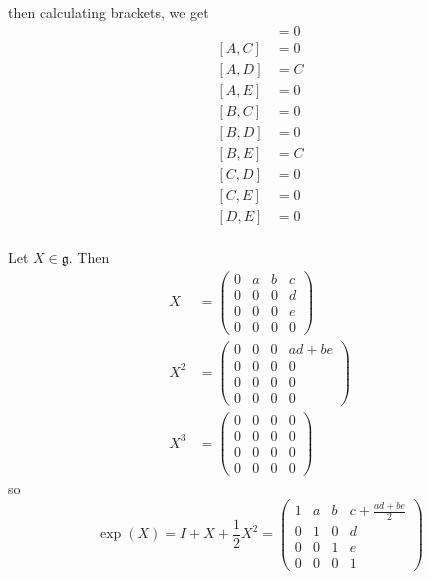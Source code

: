 \documentclass[12pt]{article}
\newcommand{\g}{\mathfrak{g}}
\begin{document}
        then calculating brackets, we get 
        \begin{align*}
            [A, B] &= 0\\
            [A, C] &= 0\\ 
            [A, D] &= C\\ 
            [A, E] &= 0\\
            [B, C] &= 0\\ 
            [B, D] &= 0\\
            [B, E] &= C\\
            [C, D] &= 0\\
            [C, E] &= 0\\
            [D, E] &= 0\\
        \end{align*}

        Let $X \in \g$. Then
        \begin{align*}
            X &= \begin{pmatrix}
                0 & a & b & c\\
                0 & 0 & 0 & d\\
                0 & 0 & 0 & e\\
                0 & 0 & 0 & 0
            \end{pmatrix}\\ 
            X^2 &= \begin{pmatrix}
                0 & 0 & 0 & ad + be\\
                0 & 0 & 0 & 0\\
                0 & 0 & 0 & 0\\
                0 & 0 & 0 & 0
            \end{pmatrix}\\ 
            X^3 &= \begin{pmatrix}
                0 & 0 & 0 & 0\\
                0 & 0 & 0 & 0\\
                0 & 0 & 0 & 0\\
                0 & 0 & 0 & 0
            \end{pmatrix}
        \end{align*}
        so 
        \[\exp(X) = I + X + \frac{1}{2}X^2 = \begin{pmatrix}
            1 & a & b & c + \frac{ad + be}{2}\\ 
            0 & 1 & 0 & d\\
            0 & 0 & 1 & e\\
            0 & 0 & 0 & 1
        \end{pmatrix}\]
\end{document}
